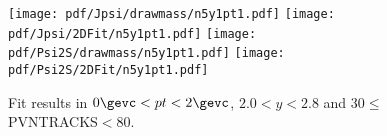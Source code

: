 \begin{figure}[H]
\begin{center}
\texttt{[image: pdf/Jpsi/drawmass/n5y1pt1.pdf]}
\texttt{[image: pdf/Jpsi/2DFit/n5y1pt1.pdf]}
\vspace*{-0.5cm}
\texttt{[image: pdf/Psi2S/drawmass/n5y1pt1.pdf]}
\texttt{[image: pdf/Psi2S/2DFit/n5y1pt1.pdf]}
\vspace*{-0.5cm}
\end{center}
\caption{Fit results in $0\gevc<pt<2\gevc$, $2.0<y<2.8$ and 30$\leq$PVNTRACKS$<$80.}
\label{Fitn5y1pt1}
\end{figure}
